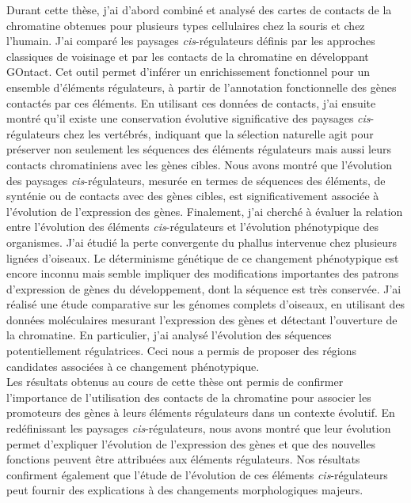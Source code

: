 Durant cette thèse, j’ai d’abord combiné et analysé des cartes de contacts de la chromatine obtenues pour plusieurs types cellulaires chez la souris et chez l’humain. J’ai comparé les paysages \textit{cis}-régulateurs définis par les approches classiques de voisinage et par les contacts de la chromatine en développant GOntact. Cet outil permet d’inférer un enrichissement fonctionnel pour un ensemble d’éléments régulateurs, à partir de l'annotation fonctionnelle des gènes contactés par ces éléments. En utilisant ces données de contacts, j’ai ensuite montré qu'il existe une conservation évolutive significative des paysages \textit{cis}-régulateurs chez les vertébrés, indiquant que la sélection naturelle agit pour préserver non seulement les séquences des éléments régulateurs mais aussi leurs contacts chromatiniens avec les gènes cibles. Nous avons montré que l'évolution des paysages \textit{cis}-régulateurs, mesurée en termes de séquences des éléments, de synténie ou de contacts avec des gènes cibles, est significativement associée à l'évolution de l'expression des gènes. Finalement, j’ai cherché à évaluer la relation entre l’évolution des éléments \textit{cis}-régulateurs et l’évolution phénotypique des organismes. J’ai étudié la perte convergente du phallus intervenue chez plusieurs lignées d’oiseaux. Le déterminisme génétique de ce changement phénotypique est encore inconnu mais semble impliquer des modifications importantes des patrons d’expression de gènes du développement, dont la séquence est très conservée. J'ai réalisé une étude comparative sur les génomes complets d'oiseaux, en utilisant des données moléculaires mesurant l'expression des gènes et détectant l’ouverture de la chromatine. En particulier, j’ai analysé l’évolution des séquences potentiellement régulatrices. Ceci nous a permis de proposer des régions candidates associées à ce changement phénotypique. \\

Les résultats obtenus au cours de cette thèse ont permis de confirmer l’importance de l’utilisation des contacts de la chromatine pour associer les promoteurs des gènes à leurs éléments régulateurs dans un contexte évolutif. En redéfinissant les paysages \textit{cis}-régulateurs, nous avons montré que leur évolution permet d’expliquer l’évolution de l’expression des gènes et que des nouvelles fonctions peuvent être attribuées aux éléments régulateurs. Nos résultats confirment également que l'étude de l'évolution de ces éléments \textit{cis}-régulateurs peut fournir des explications à des changements morphologiques majeurs.\\

